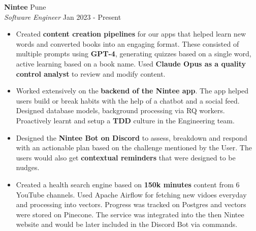\documentclass[a4paper]{article}
\begin{document}
\vspace{1mm}
\textbf{Nintee} \hfill Pune\\
\textit{Software Engineer} \hfill Jan 2023 - Present\\
\vspace{-1mm}
\begin{itemize} \itemsep 1pt
    \item Created \textbf{content creation pipelines} for our apps that helped learn new words and converted books into an engaging format. These consisted of multiple prompts using \textbf{GPT-4}, generating quizzes based on a single word, active learning based on a book name. Used \textbf{Claude Opus as a quality control analyst} to review and modify content.
    \item Worked extensively on the \textbf{backend of the Nintee app}. The app helped users build or break habits with the help of a chatbot and a social feed. Designed database models, background processing via RQ workers. Proactively learnt and setup a \textbf{TDD} culture in the Engineering team.
    \item Designed the \textbf{Nintee Bot on Discord} to assess, breakdown and respond with an actionable plan based on the challenge mentioned by the User. The users would also get \textbf{contextual reminders} that were designed to be nudges.
    \item Created a health search engine based on \textbf{150k minutes} content from 6 YouTube channels. Used Apache Airflow for fetching new vidoes everyday and processing into vectors. Progress was tracked on Postgres and vectors were stored on Pinecone. The service was integrated into the then Nintee website and would be later included in the Discord Bot via commands.
\end{itemize}

\vspace*{2mm}
\end{document}
